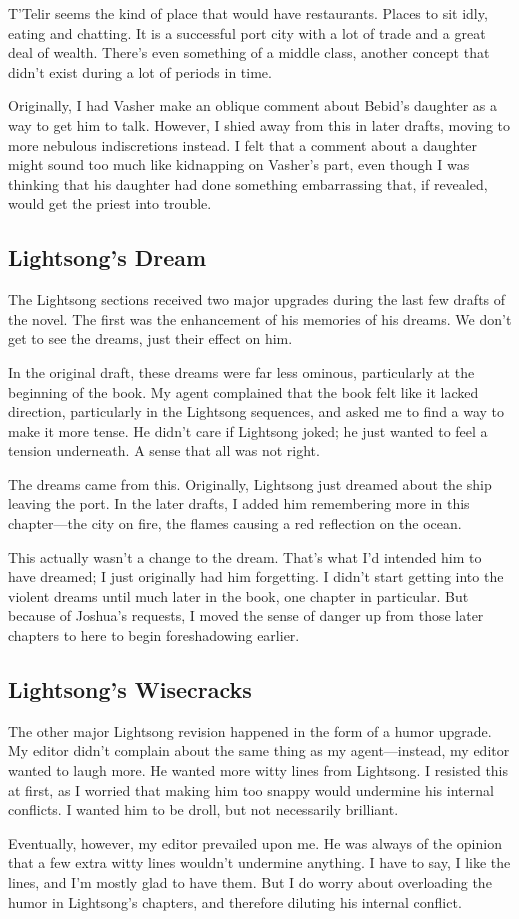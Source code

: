 T’Telir seems the kind of place that would have restaurants. Places to sit idly, eating and chatting. It is a successful port city with a lot of trade and a great deal of wealth. There’s even something of a middle class, another concept that didn’t exist during a lot of periods in time.

Originally, I had Vasher make an oblique comment about Bebid’s daughter as a way to get him to talk. However, I shied away from this in later drafts, moving to more nebulous indiscretions instead. I felt that a comment about a daughter might sound too much like kidnapping on Vasher’s part, even though I was thinking that his daughter had done something embarrassing that, if revealed, would get the priest into trouble.

\subsection*{Lightsong’s Dream}

The Lightsong sections received two major upgrades during the last few drafts of the novel. The first was the enhancement of his memories of his dreams. We don’t get to see the dreams, just their effect on him.

In the original draft, these dreams were far less ominous, particularly at the beginning of the book. My agent complained that the book felt like it lacked direction, particularly in the Lightsong sequences, and asked me to find a way to make it more tense. He didn’t care if Lightsong joked; he just wanted to feel a tension underneath. A sense that all was not right.

The dreams came from this. Originally, Lightsong just dreamed about the ship leaving the port. In the later drafts, I added him remembering more in this chapter—the city on fire, the flames causing a red reflection on the ocean.

This actually wasn’t a change to the dream. That’s what I’d intended him to have dreamed; I just originally had him forgetting. I didn’t start getting into the violent dreams until much later in the book, one chapter in particular. But because of Joshua’s requests, I moved the sense of danger up from those later chapters to here to begin foreshadowing earlier.

\subsection*{Lightsong’s Wisecracks}

The other major Lightsong revision happened in the form of a humor upgrade. My editor didn’t complain about the same thing as my agent—instead, my editor wanted to laugh more. He wanted more witty lines from Lightsong. I resisted this at first, as I worried that making him too snappy would undermine his internal conflicts. I wanted him to be droll, but not necessarily brilliant.

Eventually, however, my editor prevailed upon me. He was always of the opinion that a few extra witty lines wouldn’t undermine anything. I have to say, I like the lines, and I’m mostly glad to have them. But I do worry about overloading the humor in Lightsong’s chapters, and therefore diluting his internal conflict.


